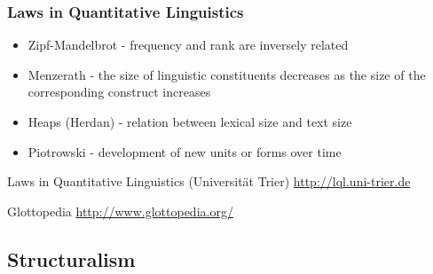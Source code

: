 \documentclass{beamer}
\begin{document}
\frame
{
  \frametitle{Laws in Quantitative Linguistics}
  \begin{itemize}
  \item Zipf-Mandelbrot - frequency and rank are inversely related
  \item Menzerath - the size of linguistic constituents decreases as the size of the corresponding construct increases
  \item Heaps (Herdan) - relation between lexical size and text size
  \item Piotrowski - development of new units or forms over time
  \end{itemize}
  
  \begin{small}
  Laws in Quantitative Linguistics (Universit\"{a}t Trier)
  \href{http://lql.uni-trier.de}{http://lql.uni-trier.de}

  Glottopedia
  \href{http://www.glottopedia.org/}{http://www.glottopedia.org/}
  \end{small}
}


\subsection{Structuralism}
\end{document}
